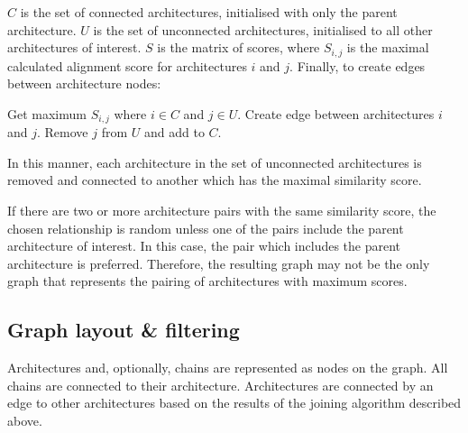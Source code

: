 $C$ is the set of connected architectures, initialised with only the parent architecture. $U$ is the set of unconnected architectures, initialised to all other architectures of interest. $S$ is the matrix of scores, where $S_{i,j}$ is the maximal calculated alignment score for architectures $i$ and $j$. Finally, to create edges between architecture nodes:
\begin{algorithmic}
\STATE Get maximum $S_{i,j}$ where $i \in C$ and $j \in U$.
\STATE Create edge between architectures $i$ and $j$.
\STATE Remove $j$ from $U$ and add to $C$.
\ENDWHILE
\end{algorithmic}
In this manner, each architecture in the set of unconnected architectures is removed and connected to another which has the maximal similarity score.

If there are two or more architecture pairs with the same similarity score, the chosen relationship is random unless one of the pairs include the parent architecture of interest. In this case, the pair which includes the parent architecture is preferred. Therefore, the resulting graph may not be the only graph that represents the pairing of architectures with maximum scores. 

\subsection{Graph layout \& filtering}
Architectures and, optionally, chains are represented as nodes on the graph. All chains are connected to their architecture. Architectures are connected by an edge to other architectures based on the results of the joining algorithm described above.  





